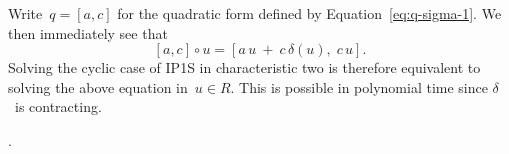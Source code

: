 \documentclass{article}
\let\fr\mathfrak
\begin{document}
Write~$q = [a, c]$ for the quadratic form defined by
Equation~\eqref{eq:q-sigma-1}. We then immediately see that
\begin{equation}\label{eq:q-transform}
[a, c] ∘ u = [a\,u \:+\: c\, δ(u),\; c\,u].
\end{equation}
Solving the cyclic case of IP1S in characteristic two is therefore
equivalent to solving the above equation in~$u ∈ R$. This is possible in
polynomial time since $δ$~is contracting.

.



% 
% 
% 
\end{document}

